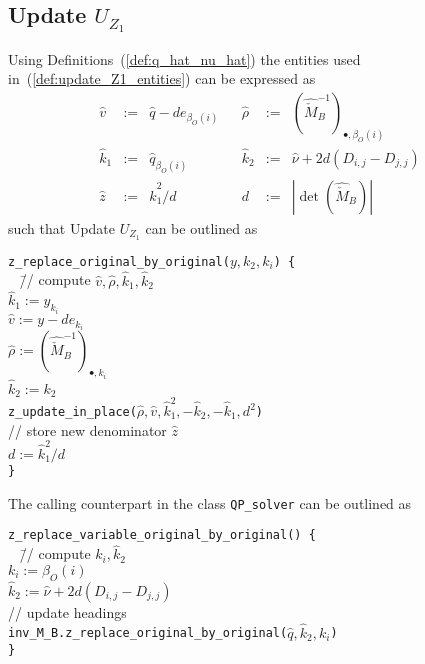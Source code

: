 \documentclass[a4paper]{article}
\begin{document}
\subsection{Update $U_{Z_{1}}$}
Using Definitions~(\ref{def:q_hat_nu_hat}) the entities used
in~(\ref{def:update_Z1_entities}) can be expressed as
\begin{equation}
\label{def:update_Z1_entities_prep}
\begin{array}{rclcrcl}
\hat{v}
&:=&
\hat{q} - d e_{\beta_{O}(i)}
&&
\hat{\rho}
&:=&
\left(\hat{\check{M}}_{B}^{-1}\right)_{\bullet, \beta_{O}(i)}
\\
\hat{k}_{1}
&:=&
\hat{q}_{\beta_{O}(i)}
&&
\hat{k}_{2}
&:=&
\hat{\nu} +2d(D_{i,j}-D_{j,j})
\\
\hat{z}
&:=&
\hat{k}_{1}^{2}/d
&&
d
&:=&
\left|\det(\hat{\check{M}}_{B})\right|
\end{array}
\end{equation}
such that Update $U_{Z_{1}}$ can be outlined as
\begin{tabbing}
\texttt{z\_replace\_original\_by\_original($y,k_{2},k_{i}$) \{}
\\
\texttt{  } \= // compute $\hat{v}, \hat{\rho}, \hat{k}_{1}, \hat{k}_{2}$ \\
\> \texttt{$\hat{k}_{1}:=y_{k_{i}}$} \\
\> \texttt{$\hat{v}:=y - de_{k_{i}}$} \\
\> \texttt{$\hat{\rho}:=
  \left(\hat{\check{M}}_{B}^{-1}\right)_{\bullet, k_{i}}$} \\
\> \texttt{$\hat{k}_{2}:=k_{2}$} \\
\> \texttt{z\_update\_in\_place($\hat{\rho}, \hat{v}, \hat{k}_{1}^{2},
-\hat{k}_{2}, -\hat{k}_{1}, d^{2}$)} \\
\> // store new denominator $\hat{z}$ \\
\> \texttt{$d:=\hat{k}_{1}^{2}/d$} \\
\texttt{\}}
\end{tabbing}
The calling counterpart in the class \texttt{QP\_solver} can be outlined as
\begin{tabbing}
\texttt{z\_replace\_variable\_original\_by\_original() \{} \\
\texttt{  } \= // compute $k_{i}, \hat{k}_{2}$ \\
\> \texttt{$k_{i}:=\beta_{O}(i)$} \\
\> \texttt{$\hat{k}_{2}:=\hat{\nu} + 2d(D_{i,j}-D_{j,j})$} \\
\> // update headings \\
\> \texttt{inv\_M\_B.z\_replace\_original\_by\_original($\hat{q},
\hat{k}_{2}, k_{i}$)} \\
\texttt{\}}
\end{tabbing}
\end{document}
